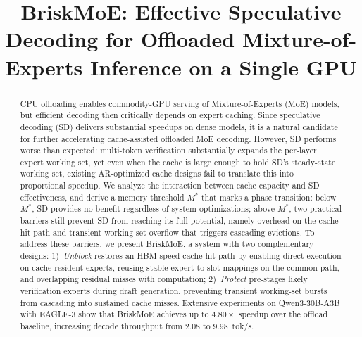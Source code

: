 \documentclass[sigconf,review,anonymous,nonacm]{acmart}
\newcommand{\sysname}{BriskMoE\xspace}
\begin{document}
\title{\sysname: Effective Speculative Decoding for Offloaded Mixture-of-Experts Inference on a Single GPU}

\begin{abstract}
CPU offloading enables commodity-GPU serving of Mixture-of-Experts (MoE) models, but efficient decoding then critically depends on expert caching. Since speculative decoding (SD) delivers substantial speedups on dense models, it is a natural candidate for further accelerating cache-assisted offloaded MoE decoding. However, SD performs worse than expected: multi-token verification substantially expands the per-layer expert working set, yet even when the cache is large enough to hold SD's steady-state working set, existing AR-optimized cache designs fail to translate this into proportional speedup. We analyze the interaction between cache capacity and SD effectiveness, and derive a memory threshold $M^*$ that marks a phase transition: below $M^*$, SD provides no benefit regardless of system optimizations; above $M^*$, two practical barriers still prevent SD from reaching its full potential, namely overhead on the cache-hit path and transient working-set overflow that triggers cascading evictions. To address these barriers, we present \sysname, a system with two complementary designs: 1)~\emph{Unblock} restores an HBM-speed cache-hit path by enabling direct execution on cache-resident experts, reusing stable expert-to-slot mappings on the common path, and overlapping residual misses with computation; 2)~\emph{Protect} pre-stages likely verification experts during draft generation, preventing transient working-set bursts from cascading into sustained cache misses. Extensive experiments on Qwen3-30B-A3B with EAGLE-3 show that \sysname achieves up to $4.80\times$ speedup over the offload baseline, increasing decode throughput from 2.08 to 9.98~tok/s.
\end{abstract}


\maketitle











\end{document}
